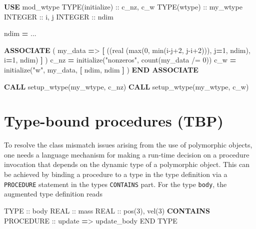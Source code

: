 \documentclass[
]{scrartcl}
\newenvironment{Shaded}{}{}
\newcommand{\DataTypeTok}[1]{\textcolor[rgb]{0.56,0.13,0.00}{#1}}
\newcommand{\DecValTok}[1]{\textcolor[rgb]{0.25,0.63,0.44}{#1}}
\newcommand{\FunctionTok}[1]{\textcolor[rgb]{0.02,0.16,0.49}{#1}}
\newcommand{\KeywordTok}[1]{\textcolor[rgb]{0.00,0.44,0.13}{\textbf{#1}}}
\newcommand{\NormalTok}[1]{#1}
\newcommand{\OperatorTok}[1]{\textcolor[rgb]{0.40,0.40,0.40}{#1}}
\newcommand{\StringTok}[1]{\textcolor[rgb]{0.25,0.44,0.63}{#1}}
\begin{document}
\begin{Shaded}
\begin{Highlighting}[]
   \KeywordTok{USE}\NormalTok{ mod\_wtype}
   \DataTypeTok{TYPE(initialize)} \DataTypeTok{::}\NormalTok{ c\_nz, c\_w}
   \DataTypeTok{TYPE(wtype)} \DataTypeTok{::}\NormalTok{ my\_wtype}
   \DataTypeTok{INTEGER} \DataTypeTok{::}\NormalTok{ i, j}
   \DataTypeTok{INTEGER} \DataTypeTok{::}\NormalTok{ ndim}

\NormalTok{   ndim }\KeywordTok{=}\NormalTok{ ...}

   \KeywordTok{ASSOCIATE}\NormalTok{ ( my\_data }\KeywordTok{=}\OperatorTok{\textgreater{}} \KeywordTok{[}\NormalTok{ ((}\DataTypeTok{real (max(0, min(i{-}j+2, j{-}i+2)))}\NormalTok{, j}\KeywordTok{=}\DecValTok{1}\NormalTok{, ndim), i}\KeywordTok{=}\DecValTok{1}\NormalTok{, ndim) }\KeywordTok{]}\NormalTok{ )}
\NormalTok{      c\_nz }\KeywordTok{=}\NormalTok{ initialize(}\StringTok{"nonzeros"}\NormalTok{, }\FunctionTok{count}\NormalTok{(my\_data }\OperatorTok{/=} \DecValTok{0}\NormalTok{))}
\NormalTok{      c\_w }\KeywordTok{=}\NormalTok{ initialize(}\StringTok{"w"}\NormalTok{, my\_data, }\KeywordTok{[}\NormalTok{ ndim, ndim }\KeywordTok{]}\NormalTok{ )}
   \KeywordTok{END ASSOCIATE}

   \KeywordTok{CALL}\NormalTok{ setup\_wtype(my\_wtype, c\_nz)}
   \KeywordTok{CALL}\NormalTok{ setup\_wtype(my\_wtype, c\_w)}
\end{Highlighting}
\end{Shaded}

\section{Type-bound procedures (TBP)}\label{type-bound-procedures-tbp}

To resolve the class mismatch issues arising from the use of polymorphic
objects, one needs a language mechanism for making a run-time decision
on a procedure invocation that depends on the dynamic type of a
polymorphic object. This can be achieved by binding a procedure to a
type in the type definition via a \texttt{PROCEDURE} statement in the
type\textquotesingle s \texttt{CONTAINS} part. For the type
\texttt{body}, the augmented type definition reads

\begin{Shaded}
\begin{Highlighting}[]
\DataTypeTok{TYPE} \DataTypeTok{::}\NormalTok{ body}
   \DataTypeTok{REAL} \DataTypeTok{::}\NormalTok{ mass}
   \DataTypeTok{REAL} \DataTypeTok{::}\NormalTok{ pos(}\DecValTok{3}\NormalTok{), vel(}\DecValTok{3}\NormalTok{)}
\KeywordTok{CONTAINS}
   \DataTypeTok{PROCEDURE} \DataTypeTok{::}\NormalTok{ update }\KeywordTok{=}\OperatorTok{\textgreater{}}\NormalTok{ update\_body}
\DataTypeTok{END TYPE}
\end{Highlighting}
\end{Shaded}
\end{document}
